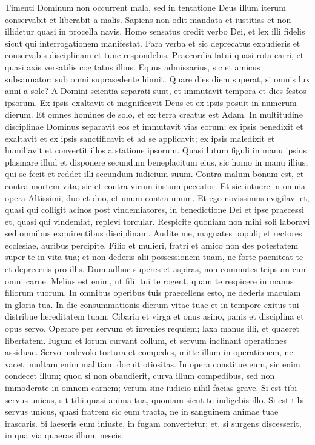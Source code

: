 \begin{biblechapter}  
\verse Timenti Dominum non occurrent mala, sed in tentatione Deus illum iterum conservabit et liberabit a malis. 
\verse Sapiens non odit mandata et iustitias et non illidetur quasi in procella navis. 
\verse Homo sensatus credit verbo Dei, et lex illi fidelis sicut qui interrogationem manifestat. 
\verse Para verba et sic deprecatus exaudieris et conservabis disciplinam et tunc respondebis. 
\verse Praecordia fatui quasi rota carri, et quasi axis versatilis cogitatus illius. 
\verse Equus admissarius, sic et amicus subsannator: sub omni suprasedente hinnit. 
\verse Quare dies diem superat, si omnis lux anni a sole? 
\verse A Domini scientia separati sunt, 
\verse et immutavit tempora et dies festos ipsorum. 
\verse Ex ipsis exaltavit et magnificavit Deus et ex ipsis posuit in numerum dierum. Et omnes homines de solo, et ex terra creatus est Adam. 
\verse In multitudine disciplinae Dominus separavit eos et immutavit vias eorum: 
\verse ex ipsis benedixit et exaltavit et ex ipsis sanctificavit et ad se applicavit; ex ipsis maledixit et humiliavit et convertit illos a statione ipsorum. 
\verse Quasi lutum figuli in manu ipsius plasmare illud et disponere 
\verse secundum beneplacitum eius, sic homo in manu illius, qui se fecit et reddet illi secundum iudicium suum. 
\verse Contra malum bonum est, et contra mortem vita; sic et contra virum iustum peccator. Et sic intuere in omnia opera Altissimi, duo et duo, et unum contra unum. 
\verse Et ego novissimus evigilavi et, quasi qui colligit acinos post vindemiatores, 
\verse in benedictione Dei et ipse praecessi et, quasi qui vindemiat, replevi torcular. 
\verse Respicite quoniam non mihi soli laboravi sed omnibus exquirentibus disciplinam. 
\verse Audite me, magnates populi; et rectores ecclesiae, auribus percipite. 
\verse Filio et mulieri, fratri et amico non des potestatem super te in vita tua; et non dederis alii possessionem tuam, ne forte paeniteat te et depreceris pro illis. 
\verse Dum adhuc superes et aspiras, non commutes teipsum cum omni carne. 
\verse Melius est enim, ut filii tui te rogent, quam te respicere in manus filiorum tuorum. 
\verse In omnibus operibus tuis praecellens esto, 
\verse ne dederis maculam in gloria tua. In die consummationis dierum vitae tuae et in tempore exitus tui distribue hereditatem tuam. 
\verse Cibaria et virga et onus asino, panis et disciplina et opus servo. 
\verse Operare per servum et invenies requiem; laxa manus illi, et quaeret libertatem. 
\verse Iugum et lorum curvant collum, et servum inclinant operationes assiduae. 
\verse Servo malevolo tortura et compedes, mitte illum in operationem, ne vacet: 
\verse multam enim malitiam docuit otiositas. 
\verse In opera constitue eum, sic enim condecet illum; quod si non obaudierit, curva illum compedibus, sed non immoderate in omnem carnem; verum sine iudicio nihil facias grave. 
\verse Si est tibi servus unicus, sit tibi quasi anima tua, quoniam sicut te indigebis illo. Si est tibi servus unicus, quasi fratrem sic eum tracta, ne in sanguinem animae tuae irascaris. 
\verse Si laeseris eum iniuste, in fugam convertetur; 
\verse et, si surgens discesserit, in qua via quaeras illum, nescis. 
\end{biblechapter}

